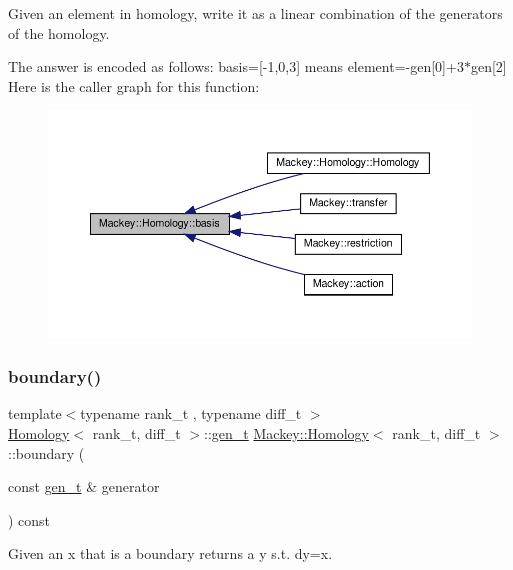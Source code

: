 Given an element in homology, write it as a linear combination of the generators of the homology. 

The answer is encoded as follows\+: basis=\mbox{[}-\/1,0,3\mbox{]} means element=-\/gen\mbox{[}0\mbox{]}+3$\ast$gen\mbox{[}2\mbox{]} Here is the caller graph for this function\+:\nopagebreak
\begin{figure}[H]
\begin{center}
\leavevmode
\includegraphics[width=350pt]{classMackey_1_1Homology_a2e6fb6da3abdba934a1eb2f4236623cb_icgraph}
\end{center}
\end{figure}
\mbox{\label{classMackey_1_1Homology_aeb3cbf5cc7cb166e8e0a552dda57d05b}} 
\subsubsection{\texorpdfstring{boundary()}{boundary()}}
{\footnotesize\ttfamily template$<$typename rank\+\_\+t , typename diff\+\_\+t $>$ \\
\hyperlink{classMackey_1_1Homology}{Homology}$<$ rank\+\_\+t, diff\+\_\+t $>$\+::\hyperlink{classMackey_1_1Homology_a0f7541ee6181c75cb7efa41f3b63f0a5}{gen\+\_\+t} \hyperlink{classMackey_1_1Homology}{Mackey\+::\+Homology}$<$ rank\+\_\+t, diff\+\_\+t $>$\+::boundary (\begin{DoxyParamCaption}\item[{const \hyperlink{classMackey_1_1Homology_a0f7541ee6181c75cb7efa41f3b63f0a5}{gen\+\_\+t} \&}]{generator }\end{DoxyParamCaption}) const}



Given an x that is a boundary returns a y s.\+t. dy=x. 

